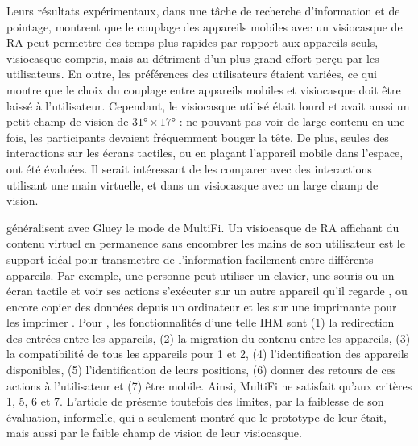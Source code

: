 Leurs résultats expérimentaux, dans une tâche de recherche d'information et de pointage, montrent que le couplage des appareils mobiles avec un visiocasque de RA peut permettre des temps plus rapides par rapport aux appareils seuls, visiocasque compris, mais au détriment d'un plus grand effort perçu par les utilisateurs. En outre, les préférences des utilisateurs étaient variées, ce qui montre que le choix du couplage entre appareils mobiles et visiocasque doit être laissé à l'utilisateur. Cependant, le visiocasque utilisé était lourd et avait aussi un petit champ de vision de $\ang{31} \times \ang{17}$ : ne pouvant pas voir de large contenu en une fois, les participants devaient fréquemment bouger la tête. De plus, seules des interactions sur les écrans tactiles, ou en plaçant l'appareil mobile dans l'espace, ont été évaluées. Il serait intéressant de les comparer avec des interactions utilisant une main virtuelle, et dans un visiocasque avec un large champ de vision.


\cite{Serrano2015} généralisent avec Gluey le mode  de MultiFi. Un visiocasque de RA affichant du contenu virtuel en permanence sans encombrer les mains de son utilisateur est le support idéal pour transmettre de l'information facilement entre différents appareils. Par exemple, une personne peut utiliser un clavier, une souris ou un écran tactile et voir ses actions s'exécuter sur un autre appareil qu'il regarde , ou encore copier des données depuis un ordinateur et les  sur une imprimante pour les imprimer . Pour \citeauthor{Serrano2015}, les fonctionnalités d'une telle IHM sont (1) la redirection des entrées entre les appareils, (2) la migration du contenu entre les appareils, (3) la compatibilité de tous les appareils pour 1 et 2, (4) l'identification des appareils disponibles, (5) l'identification de leurs positions, (6) donner des retours de ces actions à l'utilisateur et (7) être mobile. Ainsi, MultiFi ne satisfait qu'aux critères 1, 5, 6 et 7. L'article de \citeauthor{Serrano2015} présente toutefois des limites, par la faiblesse de son évaluation, informelle, qui a seulement montré que le prototype de leur était, mais aussi par le faible champ de vision de leur visiocasque.

